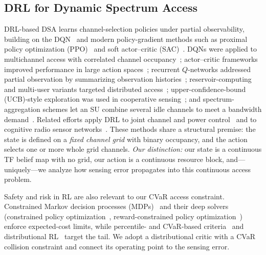 \documentclass[journal]{IEEEtran}
\begin{document}
\subsection{DRL for Dynamic Spectrum Access}
DRL-based DSA learns channel-selection policies under partial observability,
building on the DQN~\cite{mnih2015human} and modern
policy-gradient methods such as proximal policy optimization
(PPO)~\cite{schulman2017ppo} and soft actor--critic
(SAC)~\cite{haarnoja2018sac}. DQNs were applied to
multichannel access with correlated channel occupancy~\cite{wang2018};
actor--critic frameworks improved performance in large action
spaces~\cite{zhong2019}; recurrent $Q$-networks addressed partial observation
by summarizing observation histories~\cite{xu2020partial,hausknecht2015drqn,
xu2021deep}; reservoir-computing and multi-user variants targeted distributed
access~\cite{chang2019distributive,naparstek2018deep}; upper-confidence-bound
(UCB)-style exploration was used in cooperative sensing~\cite{zhang2019deep}; and
spectrum-aggregation schemes let an SU combine several idle channels to meet a
bandwidth demand~\cite{li2020aggregation}. Related efforts apply DRL to joint
channel and power control~\cite{tan2020deep} and to cognitive radio sensor
networks~\cite{lin2019deep}. These methods share a structural premise: the
state is defined on a \emph{fixed channel grid} with binary occupancy, and the
action selects one or more whole grid channels. \emph{Our distinction:} our
state is a continuous TF belief map with no grid, our action is a continuous
resource block, and---uniquely---we analyze how sensing error propagates into
this continuous access problem.

Safety and risk in RL are also relevant to our CVaR access constraint.
Constrained Markov decision processes (MDPs)~\cite{altman1999constrained} and their deep solvers
(constrained policy optimization~\cite{achiam2017cpo}, reward-constrained
policy optimization~\cite{tessler2019reward}) enforce expected-cost limits,
while percentile- and CVaR-based criteria~\cite{chow2017risk,rockafellar2000cvar}
and distributional RL~\cite{bellemare2017distributional,dabney2018qrdqn,
ma2020dsac} target the tail. We adopt a distributional critic with a CVaR
collision constraint and connect its operating point to the sensing error.
\end{document}
